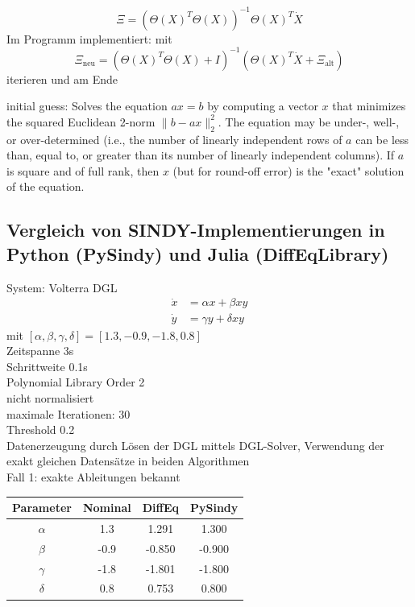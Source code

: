 \documentclass[arbeit=studie,oneside,BCOR=12mm]{ArbeitRST}
\begin{document}
\begin{equation}
\Xi = \left(\Theta(X)^T\Theta(X)\right)^{-1}\Theta(X)^T\dot{X} %
\end{equation}
Im Programm implementiert: mit
\begin{equation}
\Xi_\text{neu} = \left(\Theta(X)^T\Theta(X) + I \right)^{-1} \left(\Theta(X)^T\dot{X} + \Xi_{\text{alt}} \right)
\end{equation}
iterieren und am Ende


initial guess: Solves the equation $a x = b$ by computing a vector $x$ that
    minimizes the squared Euclidean 2-norm $\| b - a x \|^2_2$.
    The equation may be under-, well-, or over-determined (i.e., the
    number of linearly independent rows of $a$ can be less than, equal
    to, or greater than its number of linearly independent columns).
    If $a$ is square and of full rank, then $x$ (but for round-off error)
    is the "exact" solution of the equation.

\subsection{Vergleich von SINDY-Implementierungen in Python (PySindy) und Julia (DiffEqLibrary)}
System: Volterra DGL
\begin{align}
\dot{x} &= \alpha x +\beta xy\\
\dot{y} &= \gamma y + \delta xy 
\end{align}
mit $[\alpha, \beta, \gamma, \delta] = [1.3, -0.9, -1.8, 0.8]$\\
Zeitspanne 3s\\
Schrittweite 0.1s\\
Polynomial Library Order 2\\
nicht normalisiert\\
maximale Iterationen: 30\\
Threshold 0.2\\
Datenerzeugung durch Lösen der DGL mittels DGL-Solver, Verwendung der exakt gleichen Datensätze in beiden Algorithmen\\
Fall 1: exakte Ableitungen bekannt\\
\begin{tabular}[h]{c|c|c|c}
Parameter 	& Nominal 	& DiffEq		& PySindy 	\\\hline
$\alpha$ 	&  	 1.3	& 	1.291		&	1.300		\\\hline
$\beta$ 	&  	-0.9	& 	-0.850		&	-0.900		\\\hline
$\gamma$ 	&  	 -1.8	& 	-1.801		&	-1.800		\\\hline
$\delta$ 	&  	0.8		& 	0.753		&	0.800		\\
\end{tabular}
\end{document}
